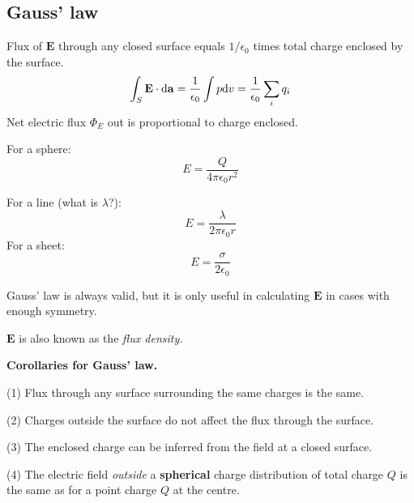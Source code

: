 \subsection*{Gauss' law}
Flux of $\mathbf{E}$ through any closed surface equals $1/\epsilon_0$ times total charge enclosed
by the surface.
\begin{equation*}
  \int_S \mathbf{E} \cdot \differential \mathbf{a} = \frac{1}{\epsilon_0} \int p \differential v = \frac{1}{\epsilon_0} \sum_{i} q_i
\end{equation*}
Net electric flux $\Phi_E$ out is proportional to charge enclosed.

For a sphere:
\begin{equation*}
  E = \frac{Q}{4\pi\epsilon_0r^2}
\end{equation*}


For a line (what is $\lambda$?):
\begin{equation*}
  E = \frac{\lambda}{2\pi\epsilon_0r}
\end{equation*}
For a sheet:
\begin{equation*}
  E = \frac{\sigma}{2\epsilon_0}
\end{equation*}

Gauss' law is always valid, but it is only useful in calculating $\mathbf{E}$ in cases with enough symmetry. 

$\mathbf{E}$ is also known as the \textit{flux density.}

\textbf{Corollaries for Gauss' law.}

(1) Flux through any surface surrounding the same charges is the same.

(2) Charges outside the surface do not affect the flux through the surface.

(3) The enclosed charge can be inferred from the field at a closed surface.

(4) The electric field \textit{outside} a \textbf{spherical} charge distribution of total charge $Q$ is the same
as for a point charge $Q$ at the centre.